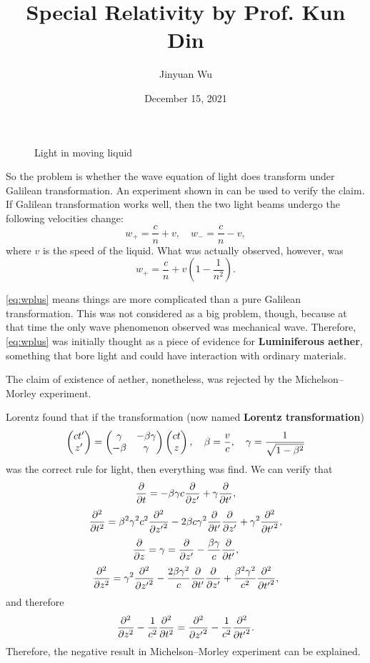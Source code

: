 \documentclass[hyperref, a4paper]{article}
\title{Special Relativity by Prof. Kun Din}
\author{Jinyuan Wu}
\date{December 15, 2021}
\newcommand*{\concept}[1]{{\textbf{#1}}}
\begin{document}
\maketitle

\begin{figure}
    \centering
    
    \caption{Light in moving liquid}
    \label{fig:light-liquid}
\end{figure}

So the problem is whether the wave equation of light does transform under Galilean transformation.
An experiment shown in  can be used to verify the claim. If Galilean transformation
works well, then the two light beams undergo the following velocities change:
\begin{equation}
    w_+ = \frac{c}{n} + v, \quad w_- = \frac{c}{n} - v,
\end{equation}
where $v$ is the speed of the liquid. What was actually observed, however, was 
\begin{equation}
    w_+ = \frac{c}{n} + v \left( 1 - \frac{1}{n^2 } \right).
    \label{eq:wplus}
\end{equation}

\eqref{eq:wplus} means things are more complicated than a pure Galilean transformation.
This was not considered as a big problem, though, because at that time the only wave phenomenon observed 
was mechanical wave. Therefore, \eqref{eq:wplus} was initially thought as a piece of evidence for 
\concept{Luminiferous aether}, something that bore light and could have interaction with ordinary materials.

The claim of existence of aether, nonetheless, was rejected by the Michelson–Morley experiment.

Lorentz found that if the transformation (now named \concept{Lorentz transformation})
\begin{equation}
    \pmqty{c t' \\ z'} = \pmqty{\gamma & - \beta \gamma \\ - \beta & \gamma} \pmqty{ct \\ z}, 
    \quad \beta = \frac{v}{c}, \quad \gamma = \frac{1}{\sqrt{1 - \beta^2}}
    \label{eq:lorentz}
\end{equation}
was the correct rule for light, then everything was find. We can verify that 
\[
    \pdv{t} = - \beta \gamma c \pdv{z'} + \gamma \pdv{t'},
\] 
\[
    \pdv[2]{t} = \beta^2 \gamma^2 c^2 \pdv[2]{{z'}} - 2 \beta c \gamma^2 \pdv{t'} \pdv{z'} + \gamma^2 \pdv[2]{{t'}},
\]
\[
    \pdv{z} = \gamma =\pdv{z'} - \frac{\beta \gamma}{c} \pdv{t'},
\]
\[
    \pdv[2]{z} = \gamma^2 \pdv[2]{{z'}} - \frac{2 \beta \gamma^2}{c} \pdv{t'} \pdv{z'} + \frac{\beta^2 \gamma^2}{c^2} \pdv[2]{{t'}},
\]
and therefore 
\begin{equation}
    \pdv[2]{z} - \frac{1}{c^2} \pdv[2]{t} = \pdv[2]{{z'}} - \frac{1}{c^2} \pdv[2]{{t'}}. 
    \label{eq:invariant-wave}
\end{equation}
Therefore, the negative result in Michelson–Morley experiment can be explained.
\end{document}
